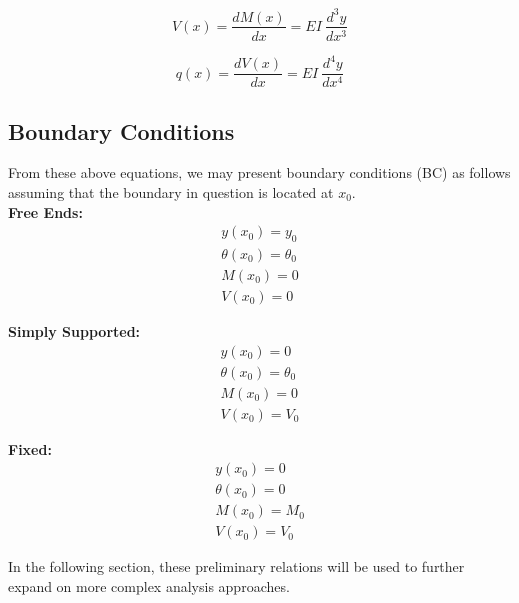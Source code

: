 \begin{equation}
	\label{eq:shr}
	V(x) = \frac{dM(x)}{dx} = EI\ \frac{d^3y}{dx^3}
\end{equation}

\begin{equation}
	\label{eq:loadintens}
	q(x) = \frac{dV(x)}{dx} = EI\ \frac{d^4y}{dx^4}
\end{equation}

\subsection{Boundary Conditions}

From these above equations, we may present boundary conditions (BC) as follows assuming that the boundary in question is located at $x_0$.\\

\textbf{Free Ends:}\\
\begin{equation}
	\label{eq:2_freeBC}
	\begin{aligned}
	y(x_0) = y_0 \\
	\theta(x_0)= \theta_0\\
	M(x_0) = 0\\
	V(x_0) = 0 
	\end{aligned}
\end{equation}

\textbf{Simply Supported:}\\
\begin{equation}
	\label{eq:2_endBC}
	\begin{aligned}
	y(x_0)= 0 \\
	\theta(x_0)=\theta_0\\
	M(x_0)= 0\\
	V(x_0) =V_0 
	\end{aligned}
\end{equation}

\textbf{Fixed:}\\
\begin{equation}
	\label{eq:2_fixedBC}
	\begin{aligned}
	y(x_0)=0 \\
	\theta(x_0)=0\\
	M(x_0)=M_0\\
	V(x_0) =V_0 
	\end{aligned}
\end{equation}

In the following section, these preliminary relations will be used to further expand on more complex analysis approaches.

